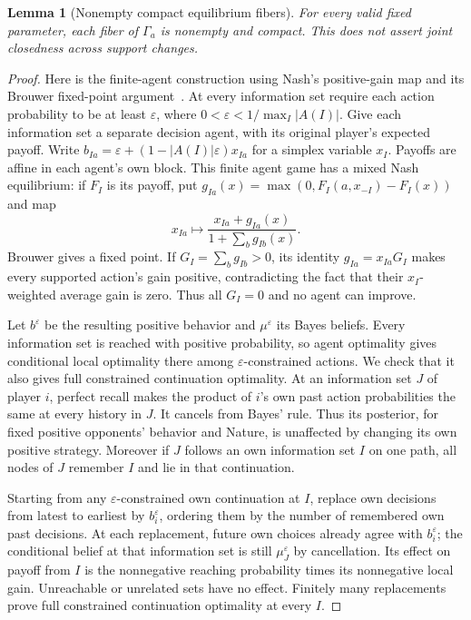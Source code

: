 \documentclass[11pt,a4paper]{article}
\numberwithin{equation}{section}
\newtheorem{lemma}[theorem]{Lemma}
\theoremstyle{definition}
\begin{document}
\begin{lemma}[Nonempty compact equilibrium fibers]\label{lem:existence}
For every valid fixed parameter, each fiber of $\Gamma_a$ is nonempty
and compact. This does not assert joint closedness across support changes.
\end{lemma}
\begin{proof}
Here is the finite-agent construction using Nash's positive-gain map and
its Brouwer fixed-point argument~\cite[Theorem 1, p. 288]{Nash}.
At every information set require each action probability to be at
least $\varepsilon$, where
$0<\varepsilon<1/\max_I|A(I)|$. Give each information set a separate
decision agent, with its original player's expected payoff. Write
$b_{Ia}=\varepsilon+(1-|A(I)|\varepsilon)x_{Ia}$ for a simplex variable
$x_I$. Payoffs are affine in each agent's own block. This finite agent
game has a mixed Nash equilibrium: if $F_I$ is its payoff, put
$g_{Ia}(x)=\max(0,F_I(a,x_{-I})-F_I(x))$ and map
\[
 x_{Ia}\longmapsto\frac{x_{Ia}+g_{Ia}(x)}{1+\sum_b g_{Ib}(x)}.
\]
Brouwer gives a fixed point. If $G_I=\sum_b g_{Ib}>0$, its identity
$g_{Ia}=x_{Ia}G_I$ makes every supported action's gain positive,
contradicting the fact that their $x_I$-weighted average gain is zero.
Thus all $G_I=0$ and no agent can improve.

Let $b^\varepsilon$ be the resulting positive behavior and
$\mu^\varepsilon$ its Bayes beliefs. Every information set is reached
with positive probability, so agent optimality gives conditional local
optimality there among $\varepsilon$-constrained actions. We check that
it also gives full constrained continuation optimality. At an information
set $J$ of player $i$, perfect recall makes the product of $i$'s own past
action probabilities the same at every history in $J$. It cancels from
Bayes' rule. Thus its posterior, for fixed positive opponents' behavior
and Nature, is unaffected by changing its own positive strategy.
Moreover if $J$ follows an own information set $I$ on one path, all nodes
of $J$ remember $I$ and lie in that continuation.

Starting from any $\varepsilon$-constrained own continuation at $I$,
replace own decisions from latest to earliest by $b_i^\varepsilon$,
ordering them by the number of remembered own past decisions. At each
replacement, future own choices already agree with $b_i^\varepsilon$;
the conditional belief at that information set is still
$\mu_J^\varepsilon$ by cancellation. Its effect on payoff from $I$ is
the nonnegative reaching probability times its nonnegative local gain.
Unreachable or unrelated sets have no effect. Finitely many replacements
prove full constrained continuation optimality at every $I$.


\end{proof}
\end{document}
